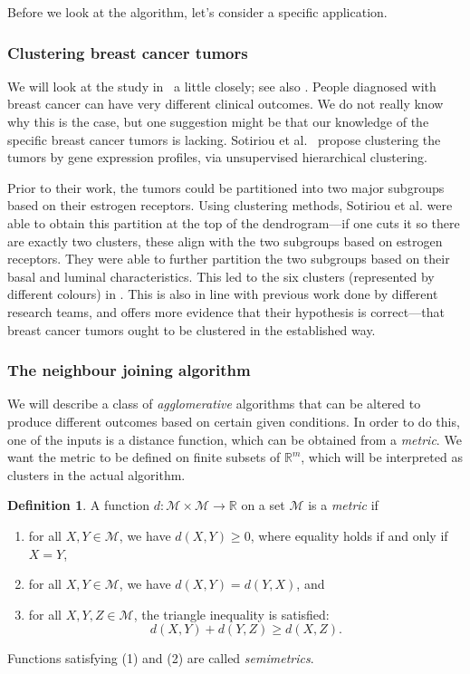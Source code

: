 \documentclass[a4paper, 12pt]{article}
\numberwithin{equation}{section}
\numberwithin{figure}{section}
\theoremstyle{definition}
\newtheorem{defn}[thm]{Definition}
\renewcommand{\geq}{\geqslant}
\newcommand{\R}{\mathbb{R}}
\begin{document}
Before we look at the algorithm, let's consider a specific application.

\subsubsection{Clustering breast cancer tumors}

We will look at the study in~\cite{BreastCancer} a little closely; see also
. People diagnosed with breast cancer can have very
different clinical outcomes. We do not really know why this is the case, but one
suggestion might be that our knowledge of the specific breast cancer tumors is
lacking. Sotiriou et al.~\cite{BreastCancer} propose clustering the tumors by
gene expression profiles, via unsupervised hierarchical clustering. 

Prior to their work, the tumors could be partitioned into two major subgroups
based on their estrogen receptors. Using clustering methods, Sotiriou et al.
were able to obtain this partition at the top of the dendrogram---if one cuts it
so there are exactly two clusters, these align with the two subgroups based on
estrogen receptors. They were able to further partition the two subgroups based
on their basal and luminal characteristics. This led to the six clusters
(represented by different colours) in . This is also
in line with previous work done by different research teams, and offers more
evidence that their hypothesis is correct---that breast cancer tumors ought to
be clustered in the established way.

\subsubsection{The neighbour joining algorithm}

We will describe a class of \emph{agglomerative} algorithms that can be altered
to produce different outcomes based on certain given conditions. In order to do
this, one of the inputs is a distance function, which can be obtained from a
\emph{metric}. We want the metric to be defined on finite subsets of $\R^m$,
which will be interpreted as clusters in the actual algorithm. 

\begin{defn}
	A function $d: \mathscr{M}\times \mathscr{M} \to \R$ on a set $\mathscr{M}$
	is a \emph{metric} if 
	\begin{enumerate}
		\item for all $X, Y\in \mathscr{M}$, we have $d(X, Y) \geq 0$, where
		equality holds if and only if $X=Y$,
		\item for all $X, Y\in\mathscr{M}$, we have $d(X, Y) = d(Y, X)$, and
		\item for all $X, Y, Z\in\mathscr{M}$, the triangle inequality is
		satisfied:
		\[ 
			d(X, Y) + d(Y, Z) \geq d(X, Z). 
		\] 
	\end{enumerate}
	Functions satisfying (1) and (2) are called \emph{semimetrics}. 
\end{defn}
\end{document}
